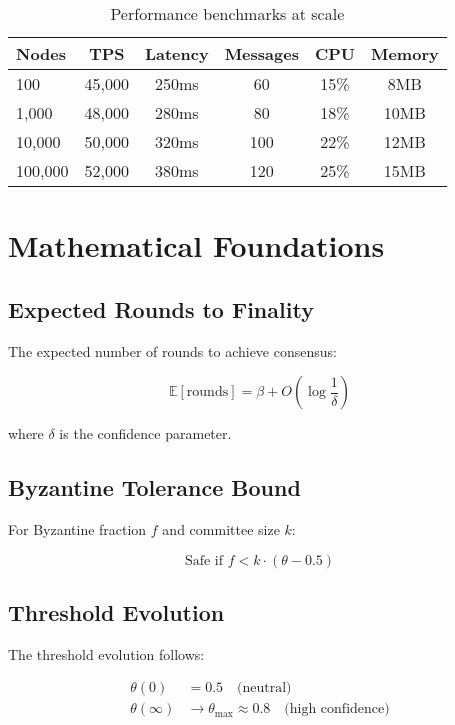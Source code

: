 \documentclass[11pt,a4paper]{article}
\begin{document}
\begin{table}[h]
\centering
\begin{tabular}{lccccc}
\toprule
\textbf{Nodes} & \textbf{TPS} & \textbf{Latency} & \textbf{Messages} & \textbf{CPU} & \textbf{Memory} \\
\midrule
100 & 45,000 & 250ms & 60 & 15\% & 8MB \\
1,000 & 48,000 & 280ms & 80 & 18\% & 10MB \\
10,000 & 50,000 & 320ms & 100 & 22\% & 12MB \\
100,000 & 52,000 & 380ms & 120 & 25\% & 15MB \\
\bottomrule
\end{tabular}
\caption{Performance benchmarks at scale}
\label{tab:benchmarks}
\end{table}

\section{Mathematical Foundations}
\label{sec:math}

\subsection{Expected Rounds to Finality}

The expected number of rounds to achieve consensus:

\begin{equation}
\mathbb{E}[\text{rounds}] = \beta + O\left(\log\frac{1}{\delta}\right)
\end{equation}

where $\delta$ is the confidence parameter.

\subsection{Byzantine Tolerance Bound}

For Byzantine fraction $f$ and committee size $k$:

\begin{equation}
\text{Safe if } f < k \cdot (\theta - 0.5)
\end{equation}

\subsection{Threshold Evolution}

The threshold evolution follows:

\begin{align}
\theta(0) &= 0.5 \quad \text{(neutral)} \\
\theta(\infty) &\to \theta_{\max} \approx 0.8 \quad \text{(high confidence)}
\end{align}
\end{document}
